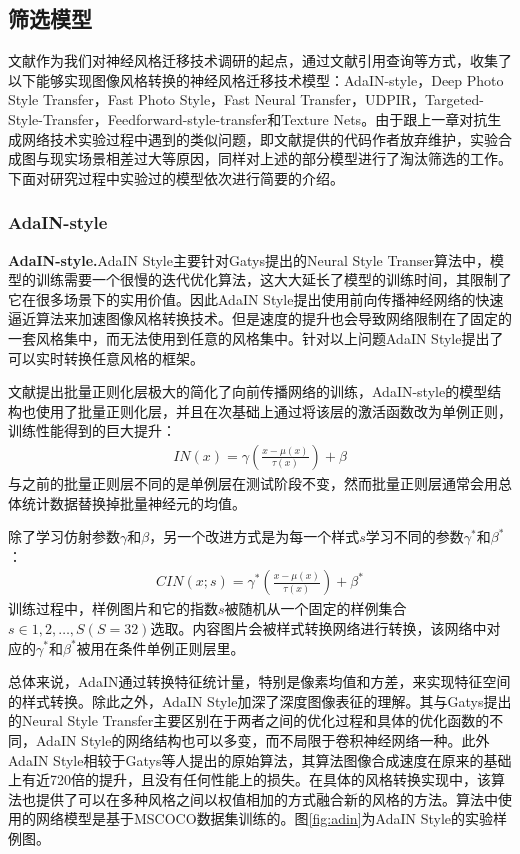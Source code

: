 \subsection{筛选模型}

文献\cite{nst-survey}作为我们对神经风格迁移技术调研的起点，通过文献引用查询等方式，收集了以下能够实现图像风格转换的神经风格迁移技术模型：AdaIN-style\cite{adain}，Deep Photo Style Transfer\cite{dpst}，Fast Photo Style\cite{fps}，Fast Neural Transfer\cite{FNT}，UDPIR\cite{UDPIR}，Targeted-Style-Transfer\cite{Targeted-Style-Transfer}，Feedforward-style-transfer\cite{Feedforward-style-transfer}和Texture Nets\cite{texture-nets}。由于跟上一章对抗生成网络技术实验过程中遇到的类似问题，即文献提供的代码作者放弃维护，实验合成图与现实场景相差过大等原因，同样对上述的部分模型进行了淘汰筛选的工作。下面对研究过程中实验过的模型依次进行简要的介绍。


\subsubsection[AdaIN-style]{AdaIN-style}

\textbf{AdaIN-style.}\cite{adain}\quad AdaIN Style主要针对Gatys提出的Neural Style Transer算法中，模型的训练需要一个很慢的迭代优化算法，这大大延长了模型的训练时间，其限制了它在很多场景下的实用价值。因此AdaIN Style提出使用前向传播神经网络的快速逼近算法来加速图像风格转换技术。但是速度的提升也会导致网络限制在了固定的一套风格集中，而无法使用到任意的风格集中。针对以上问题AdaIN Style提出了可以实时转换任意风格的框架。

文献\cite{ioffe}提出批量正则化层极大的简化了向前传播网络的训练，AdaIN-style的模型结构也使用了批量正则化层，并且在次基础上通过将该层的激活函数改为单例正则，训练性能得到的巨大提升：
\begin{align}
    IN(x)=\gamma(\frac{x-\mu(x)}{\tau(x)})+\beta
\end{align}
与之前的批量正则层不同的是单例层在测试阶段不变，然而批量正则层通常会用总体统计数据替换掉批量神经元的均值。

除了学习仿射参数$\gamma$和$\beta$，另一个改进方式是为每一个样式$s$学习不同的参数$\gamma^*$和$\beta^*$：
\begin{align}
    CIN(x;s)=\gamma^*(\frac{x-\mu(x)}{\tau(x)})+\beta^*
\end{align}
训练过程中，样例图片和它的指数$s$被随机从一个固定的样例集合$s\in {1,2,\dots,S}(S=32)$选取。内容图片会被样式转换网络进行转换，该网络中对应的$\gamma^*$和$\beta^*$被用在条件单例正则层里。

总体来说，AdaIN通过转换特征统计量，特别是像素均值和方差，来实现特征空间的样式转换。除此之外，AdaIN Style加深了深度图像表征的理解。其与Gatys提出的Neural Style Transfer主要区别在于两者之间的优化过程和具体的优化函数的不同，AdaIN Style的网络结构也可以多变，而不局限于卷积神经网络一种。此外AdaIN Style相较于Gatys等人提出的原始算法，其算法图像合成速度在原来的基础上有近720倍的提升\cite{adin-github}，且没有任何性能上的损失。在具体的风格转换实现中，该算法也提供了可以在多种风格之间以权值相加的方式融合新的风格的方法。算法中使用的网络模型是基于MSCOCO\cite{mscoco}数据集训练的。图\ref{fig:adin}为AdaIN Style的实验样例图。

